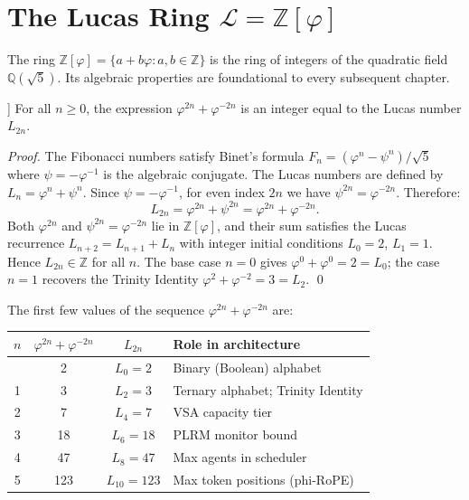 \section{The Lucas Ring \(\mathcal{L} = \mathbb{Z}[\varphi]\)}

The ring \(\mathbb{Z}[\varphi] = \{a + b\varphi : a, b \in \mathbb{Z}\}\) is the ring of integers of the quadratic field \(\mathbb{Q}(\sqrt{5})\). Its algebraic properties are foundational to every subsequent chapter.

\begin{theorem}[Lucas closure in \(\mathbb{Z}[\varphi]\)]\label{fa_00:thm:lucas-closure}
For all \(n \geq 0\), the expression \(\varphi^{2n} + \varphi^{-2n}\) is an integer equal to the Lucas number \(L_{2n}\).
\end{theorem}
\begin{proof}
The Fibonacci numbers satisfy Binet's formula \(F_n = (\varphi^n - \psi^n)/\sqrt{5}\) where \(\psi = -\varphi^{-1}\) is the algebraic conjugate. The Lucas numbers are defined by \(L_n = \varphi^n + \psi^n\). Since \(\psi = -\varphi^{-1}\), for even index \(2n\) we have \(\psi^{2n} = \varphi^{-2n}\). Therefore:
\[
  L_{2n} = \varphi^{2n} + \psi^{2n} = \varphi^{2n} + \varphi^{-2n}.
\]
Both \(\varphi^{2n}\) and \(\psi^{2n} = \varphi^{-2n}\) lie in \(\mathbb{Z}[\varphi]\), and their sum satisfies the Lucas recurrence \(L_{n+2} = L_{n+1} + L_n\) with integer initial conditions \(L_0 = 2\), \(L_1 = 1\). Hence \(L_{2n} \in \mathbb{Z}\) for all \(n\). The base case \(n=0\) gives \(\varphi^0 + \varphi^0 = 2 = L_0\); the case \(n=1\) recovers the Trinity Identity \(\varphi^2 + \varphi^{-2} = 3 = L_2\).
\qed
\end{proof}

The first few values of the sequence \(\varphi^{2n} + \varphi^{-2n}\) are:

\begin{longtable}[]{@{}cccl@{}}
\toprule\noalign{}
\(n\) & \(\varphi^{2n} + \varphi^{-2n}\) & \(L_{2n}\) & Role in architecture \\
\midrule\noalign{}
\endhead
\bottomrule\noalign{}
\endlastfoot
0 & 2 & \(L_0 = 2\) & Binary (Boolean) alphabet \\
1 & 3 & \(L_2 = 3\) & Ternary alphabet; Trinity Identity \\
2 & 7 & \(L_4 = 7\) & VSA capacity tier \\
3 & 18 & \(L_6 = 18\) & PLRM monitor bound \\
4 & 47 & \(L_8 = 47\) & Max agents in scheduler \\
5 & 123 & \(L_{10} = 123\) & Max token positions (phi-RoPE) \\
\end{longtable}

